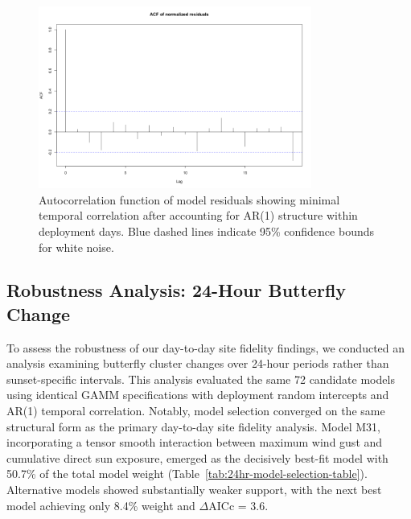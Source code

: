 \begin{figure}[htbp]
    \centering
    \includegraphics[width=0.8\textwidth]{supplemental/results/sunset/figures/diag_acf.png}
    \caption[Autocorrelation function (M32)]{Autocorrelation function of model residuals showing minimal temporal correlation after accounting for AR(1) structure within deployment days. Blue dashed lines indicate 95\% confidence bounds for white noise.}
    \label{fig:acf_diagnostics_sunset}
\end{figure}

\subsection{Robustness Analysis: 24-Hour Butterfly Change}

To assess the robustness of our day-to-day site fidelity findings, we conducted an analysis examining butterfly cluster changes over 24-hour periods rather than sunset-specific intervals. This analysis evaluated the same 72 candidate models using identical GAMM specifications with deployment random intercepts and AR(1) temporal correlation. Notably, model selection converged on the same structural form as the primary day-to-day site fidelity analysis. Model M31, incorporating a tensor smooth interaction between maximum wind gust and cumulative direct sun exposure, emerged as the decisively best-fit model with 50.7\% of the total model weight (Table~\ref{tab:24hr-model-selection-table}). Alternative models showed substantially weaker support, with the next best model achieving only 8.4\% weight and $\Delta$AICc = 3.6.



